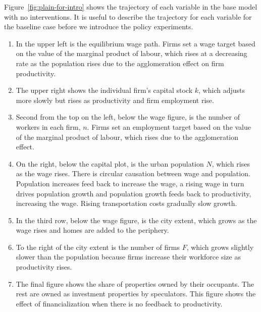 Figure~\ref{fig:plain-for-intro} shows the trajectory of each variable in the base model with no interventions. %
It is useful to describe the trajectory for each variable for the baseline case before we introduce the policy experiments.  
\begin{enumerate}
\item In the upper left is the equilibrium wage path.  Firms set a wage target based on the value of the marginal product of labour, which rises at a decreasing rate as the population rises due to the agglomeration effect on firm productivity.

\item The upper right shows the individual firm's capital stock $k$, which adjusts more slowly but rises as productivity and firm employment rise.  %

\item Second from the top on the left, below the wage figure, is the number of workers in each firm, $n$. Firms set an employment target based on the value of the marginal product of labour, which rises due to the agglomeration effect. %

\item On the right, below the capital plot, is the urban population $N$, which rises as the wage rises. There is circular causation between wage and population. Population increases feed back to increase the wage, a rising wage in turn drives population growth and population growth feeds back to productivity, increasing the wage. Rising transportation costs gradually slow growth. %

\item In the third row, below the wage figure, is the city extent, which grows as the wage rises and homes are added to the periphery. 

\item To the right of the city extent is the number of firms $F$, which grows slightly slower than the population because firms increase their workforce size as productivity rises.

\item The final figure shows the share of properties owned by their occupants. The rest are owned as investment properties by speculators. This figure shows the effect of financialization when there is no feedback to productivity. 
\end{enumerate}


